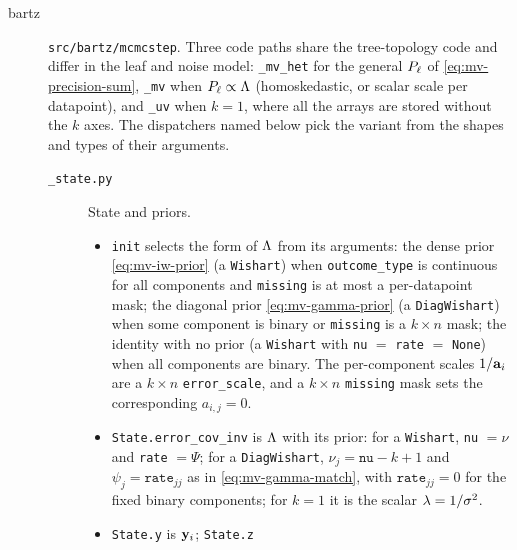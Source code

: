 \begin{description}
	\item[bartz] \texttt{src/bartz/mcmcstep}. Three code paths share the
	      tree-topology code and differ in the leaf and noise model:
	      \texttt{\_mv\_het} for the general $P_\ell$ of
	      \eqref{eq:mv-precision-sum}, \texttt{\_mv} when $P_\ell \propto \Lambda$
	      (homoskedastic, or scalar scale per datapoint), and \texttt{\_uv}
	      when $k = 1$, where all the arrays are stored without the $k$
	      axes. The dispatchers named below pick the variant from the shapes
	      and types of their arguments.
	      \begin{description}
		      \item[\texttt{\_state.py}] State and priors.
		            \begin{itemize}
			            \item \texttt{init} selects the form of $\Lambda$ from
			                  its arguments: the dense prior
			                  \eqref{eq:mv-iw-prior} (a \texttt{Wishart}) when
			                  \texttt{outcome\_type} is continuous for all
			                  components and \texttt{missing} is at most a
			                  per-datapoint mask; the diagonal prior
			                  \eqref{eq:mv-gamma-prior} (a
			                  \texttt{DiagWishart}) when some component is
			                  binary or \texttt{missing} is a $k \times n$
			                  mask; the identity with no prior (a
			                  \texttt{Wishart} with \texttt{nu} $=$
			                  \texttt{rate} $=$ \texttt{None}) when all
			                  components are binary. The per-component
			                  scales $1/\mathbf{a}_i$ are a $k \times n$
			                  \texttt{error\_scale}, and a $k \times n$
			                  \texttt{missing} mask sets the corresponding
			                  $a_{i,j} = 0$.
			            \item \texttt{State.error\_cov\_inv} is $\Lambda$
			                  with its prior: for a \texttt{Wishart},
			                  \texttt{nu} $= \nu$ and \texttt{rate} $= \Psi$;
			                  for a \texttt{DiagWishart},
			                  $\nu_j = \texttt{nu} - k + 1$ and
			                  $\psi_j = \texttt{rate}_{jj}$ as in
			                  \eqref{eq:mv-gamma-match}, with
			                  $\texttt{rate}_{jj} = 0$ for the fixed binary
			                  components; for $k = 1$ it is the scalar
			                  $\lambda = 1/\sigma^{2}$.
			            \item \texttt{State.y} is $\mathbf{y}_i$; \texttt{State.z}

\end{itemize}
\end{description}
\end{description}
